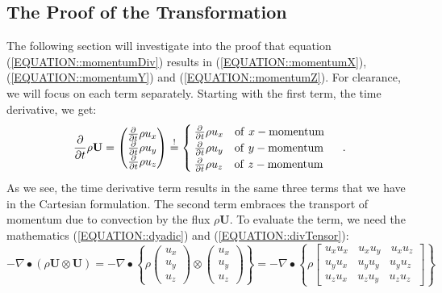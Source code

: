 \documentclass[MathematicsNumericsDerivationsAndOpenFOAM.tex]{subfiles}
\begin{document}
\subsection{The Proof of the Transformation}
%
%
    The following section will investigate into the proof that equation
    (\ref{EQUATION::momentumDiv}) results in (\ref{EQUATION::momentumX}),
    (\ref{EQUATION::momentumY}) and (\ref{EQUATION::momentumZ}).
%
%
    For clearance, we will focus on each term separately. Starting with the
    first term, the time derivative, we get:
%
%
\begin{equation}
  \frac{\partial}{\partial t} \rho \textbf{U}
=
  \left(
  \begin{matrix}
      \frac{\partial}{\partial t} \rho u_x \\
      \frac{\partial}{\partial t} \rho u_y \\
      \frac{\partial}{\partial t} \rho u_z
  \end{matrix}
  \right)
\overset{!}{=}
\begin{cases}
  \frac{\partial}{\partial t} \rho u_x  ~~~ \mathrm{of~}x-\mathrm{momentum}\\
  \frac{\partial}{\partial t} \rho u_y  ~~~ \mathrm{of~}y-\mathrm{momentum}\\
  \frac{\partial}{\partial t} \rho u_z  ~~~ \mathrm{of~}z-\mathrm{momentum}
\end{cases} ~.
\end{equation}
%
%
    As we see, the time derivative term results in the same three terms that we
    have in the Cartesian formulation. The second term embraces the transport of
    momentum due to convection by the flux $\rho \textbf{U}$. To evaluate the
    term, we need the mathematics (\ref{EQUATION::dyadic}) and
    (\ref{EQUATION::divTensor}):
%
%
\begin{equation*}
 -   \nabla \bullet \left(\rho\textbf{U} \otimes \textbf{U}\right)
=
-   \nabla \bullet
  \left\{
  \rho
  \left(
  \begin{matrix}
    u_x \\
    u_y \\
    u_z
  \end{matrix}
  \right)
\otimes
\left(
  \begin{matrix}
    u_x \\
    u_y \\
    u_z
  \end{matrix}
  \right)
  \right\}
=
-   \nabla \bullet
  \left\{
  \rho
  \left[
  \begin{matrix}
    u_x u_x ~~~~ u_x u_y ~~~~ u_x u_z \\
    u_y u_x ~~~~ u_y u_y ~~~~ u_y u_z \\
    u_z u_x ~~~~ u_z u_y ~~~~ u_z u_z
  \end{matrix}
  \right]
  \right\}
\end{equation*}
\end{document}
